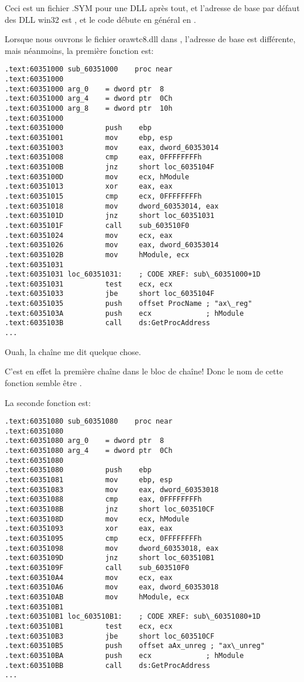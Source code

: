 Ceci est un fichier .SYM pour une DLL après tout, et l'adresse de base par défaut
des DLL win32 est , et le code débute en général en .

Lorsque nous ouvrons le fichier orawtc8.dll dans \IDA, l'adresse de base est
différente, mais néanmoins, la première fonction est:

\begin{lstlisting}[style=customasmx86]
.text:60351000 sub_60351000    proc near
.text:60351000
.text:60351000 arg_0    = dword ptr  8
.text:60351000 arg_4    = dword ptr  0Ch
.text:60351000 arg_8    = dword ptr  10h
.text:60351000
.text:60351000          push    ebp
.text:60351001          mov     ebp, esp
.text:60351003          mov     eax, dword_60353014
.text:60351008          cmp     eax, 0FFFFFFFFh
.text:6035100B          jnz     short loc_6035104F
.text:6035100D          mov     ecx, hModule
.text:60351013          xor     eax, eax
.text:60351015          cmp     ecx, 0FFFFFFFFh
.text:60351018          mov     dword_60353014, eax
.text:6035101D          jnz     short loc_60351031
.text:6035101F          call    sub_603510F0
.text:60351024          mov     ecx, eax
.text:60351026          mov     eax, dword_60353014
.text:6035102B          mov     hModule, ecx
.text:60351031
.text:60351031 loc_60351031:    ; CODE XREF: sub\_60351000+1D
.text:60351031          test    ecx, ecx
.text:60351033          jbe     short loc_6035104F
.text:60351035          push    offset ProcName ; "ax\_reg"
.text:6035103A          push    ecx             ; hModule
.text:6035103B          call    ds:GetProcAddress
...
\end{lstlisting}

Ouah, la chaîne  me dit quelque chose.

C'est en effet la première chaîne dans le bloc de chaîne!
Donc le nom de cette fonction semble être .

La seconde fonction est:

\begin{lstlisting}[style=customasmx86]
.text:60351080 sub_60351080    proc near
.text:60351080
.text:60351080 arg_0    = dword ptr  8
.text:60351080 arg_4    = dword ptr  0Ch
.text:60351080
.text:60351080          push    ebp
.text:60351081          mov     ebp, esp
.text:60351083          mov     eax, dword_60353018
.text:60351088          cmp     eax, 0FFFFFFFFh
.text:6035108B          jnz     short loc_603510CF
.text:6035108D          mov     ecx, hModule
.text:60351093          xor     eax, eax
.text:60351095          cmp     ecx, 0FFFFFFFFh
.text:60351098          mov     dword_60353018, eax
.text:6035109D          jnz     short loc_603510B1
.text:6035109F          call    sub_603510F0
.text:603510A4          mov     ecx, eax
.text:603510A6          mov     eax, dword_60353018
.text:603510AB          mov     hModule, ecx
.text:603510B1
.text:603510B1 loc_603510B1:    ; CODE XREF: sub\_60351080+1D
.text:603510B1          test    ecx, ecx
.text:603510B3          jbe     short loc_603510CF
.text:603510B5          push    offset aAx_unreg ; "ax\_unreg"
.text:603510BA          push    ecx             ; hModule
.text:603510BB          call    ds:GetProcAddress
...
\end{lstlisting}

